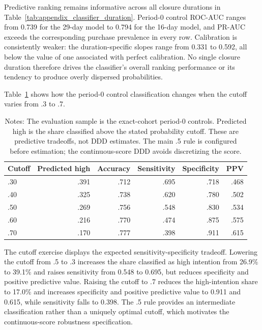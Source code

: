 \documentclass[11 pt]{article}
\newcommand\fnote[1]{\captionsetup{font=footnotesize}\caption*{#1}}
\begin{document}
Predictive ranking remains informative across all closure durations in Table~\ref{tab:appendix_classifier_duration}. Period-$0$ control ROC-AUC ranges from 0.739 for the 29-day model to 0.794 for the 16-day model, and PR-AUC exceeds the corresponding purchase prevalence in every row. Calibration is consistently weaker: the duration-specific slopes range from 0.331 to 0.592, all below the value of one associated with perfect calibration. No single closure duration therefore drives the classifier's overall ranking performance or its tendency to produce overly dispersed probabilities.

Table~\ref{tab:appendix_classifier_thresholds} shows how the period-$0$ control classification changes when the cutoff varies from .3 to .7.

\begin{table}[!ht]
\centering
\caption{Predictive tradeoffs across classification cutoffs}
\label{tab:appendix_classifier_thresholds}
\small
\begin{tabularx}{0.88\textwidth}{Xrrrrr}
\toprule
Cutoff & Predicted high & Accuracy & Sensitivity & Specificity & PPV \\
\midrule
.30 & .391 & .712 & .695 & .718 & .468 \\
.40 & .325 & .738 & .620 & .780 & .502 \\
.50 & .269 & .756 & .548 & .830 & .534 \\
.60 & .216 & .770 & .474 & .875 & .575 \\
.70 & .170 & .777 & .398 & .911 & .615 \\
\bottomrule
\end{tabularx}
\vspace{1mm}
\fnote{Notes: The evaluation sample is the exact-cohort period-0 controls. Predicted high is the share classified above the stated probability cutoff. These are predictive tradeoffs, not DDD estimates. The main .5 rule is configured before estimation; the continuous-score DDD avoids discretizing the score.}
\end{table}

The cutoff exercise displays the expected sensitivity-specificity tradeoff. Lowering the cutoff from .5 to .3 increases the share classified as high intention from 26.9\% to 39.1\% and raises sensitivity from 0.548 to 0.695, but reduces specificity and positive predictive value. Raising the cutoff to .7 reduces the high-intention share to 17.0\% and increases specificity and positive predictive value to 0.911 and 0.615, while sensitivity falls to 0.398. The .5 rule provides an intermediate classification rather than a uniquely optimal cutoff, which motivates the continuous-score robustness specification.
\end{document}
